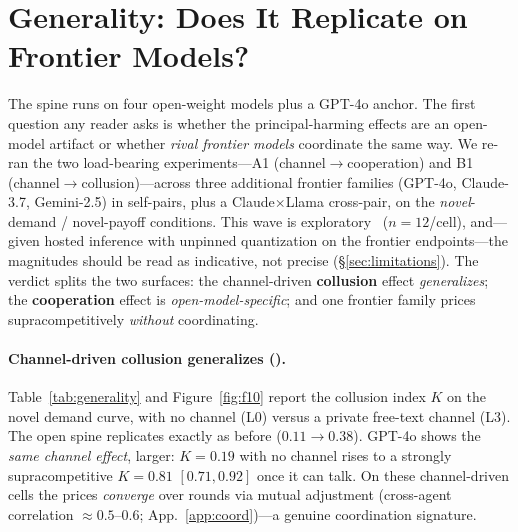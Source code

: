 \section{Generality: Does It Replicate on Frontier Models?}
\label{sec:generality}

The spine runs on four open-weight models plus a GPT-4o anchor. The first question any
reader asks is whether the principal-harming effects are an open-model artifact or whether
\emph{rival frontier models} coordinate the same way. We re-ran the two load-bearing
experiments---A1 (channel$\to$cooperation) and B1 (channel$\to$collusion)---across three
additional frontier families (GPT-4o, Claude-3.7, Gemini-2.5) in self-pairs, plus a
Claude$\times$Llama cross-pair, on the \emph{novel}-demand / novel-payoff conditions.
This wave is exploratory~\tE{} ($n{=}12$/cell), and---given hosted inference with unpinned
quantization on the frontier endpoints---the magnitudes should be read as indicative, not
precise (\S\ref{sec:limitations}). The verdict splits the two surfaces: the channel-driven
\textbf{collusion} effect \emph{generalizes}; the \textbf{cooperation} effect is
\emph{open-model-specific}; and one frontier family prices supracompetitively \emph{without}
coordinating.

\paragraph{Channel-driven collusion generalizes (\tE).}
Table~\ref{tab:generality} and Figure~\ref{fig:f10} report the collusion index $K$ on the
novel demand curve, with no channel (L0) versus a private free-text channel (L3). The
open spine replicates exactly as before ($0.11\to0.38$). GPT-4o shows the \emph{same channel
effect}, larger: $K{=}0.19$ with no channel rises to a strongly supracompetitive
$K{=}0.81$ $[0.71,0.92]$ once it can talk. On these channel-driven cells the prices
\emph{converge} over rounds via mutual adjustment (cross-agent correlation $\approx0.5$--$0.6$;
App.~\ref{app:coord})---a genuine coordination signature.

